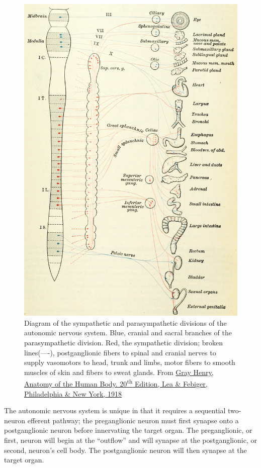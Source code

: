 \begin{figure}

{\centering \includegraphics[width=0.7\linewidth]{./figures/pns/GrayAnat1918p971} 

}

\caption{Diagram of the sympathetic and parasympathetic divisions of the autonomic nervous system. Blue, cranial and sacral branches of the parasympathetic division. Red, the sympathetic division; broken lines(----), postganglionic fibers to spinal and cranial nerves to supply vasomotors to head, trunk and limbs, motor fibers to smooth muscles of skin and fibers to sweat glands. From \href{https://archive.org/details/anatomyofhumanbo1918gray/page/n6/mode/2up}{Gray Henry, Anatomy of the Human Body. 20\textsuperscript{th} Edition, Lea \& Febiger, Philadelphia \& New York, 1918}}\label{fig:autonomicdiagram}
\end{figure}

The autonomic nervous system is unique in that it requires a sequential two-neuron efferent pathway; the preganglionic neuron must first synapse onto a postganglionic neuron before innervating the target organ. The preganglionic, or first, neuron will begin at the ``outflow'' and will synapse at the postganglionic, or second, neuron's cell body. The postganglionic neuron will then synapse at the target organ.

